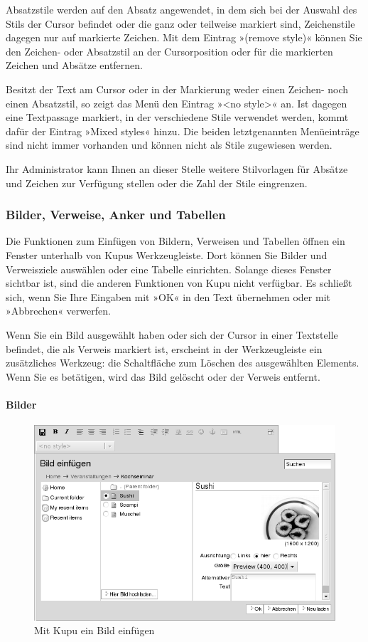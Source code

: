 \documentclass[a4paper,12pt,ngerman]{manual}
\begin{document}
Absatzstile werden auf den Absatz angewendet, in dem sich bei der Auswahl des
Stils der Cursor befindet oder die ganz oder teilweise markiert sind,
Zeichenstile dagegen nur auf markierte Zeichen. Mit dem Eintrag »(remove
style)« können Sie den Zeichen- oder Absatzstil an der Cursorposition oder für
die markierten Zeichen und Absätze entfernen.

Besitzt der Text am Cursor oder in der Markierung weder einen Zeichen- noch
einen Absatzstil, so zeigt das Menü den Eintrag »\textless{}no style\textgreater{}« an. Ist dagegen
eine Textpassage markiert, in der verschiedene Stile verwendet werden, kommt
dafür der Eintrag »Mixed styles« hinzu. Die beiden letztgenannten Menüeinträge
sind nicht immer vorhanden und können nicht als Stile zugewiesen werden.

Ihr Administrator kann Ihnen an dieser Stelle weitere Stilvorlagen für Absätze
und Zeichen zur Verfügung stellen oder die Zahl der Stile eingrenzen.


\subsubsection{Bilder, Verweise, Anker und Tabellen}

Die Funktionen zum Einfügen von Bildern, Verweisen und Tabellen öffnen ein
Fenster unterhalb von Kupus Werkzeugleiste. Dort können Sie Bilder und
Verweisziele auswählen oder eine Tabelle einrichten. Solange dieses Fenster
sichtbar ist, sind die anderen Funktionen von Kupu nicht verfügbar. Es
schließt sich, wenn Sie Ihre Eingaben mit »OK« in den Text übernehmen oder mit
»Abbrechen« verwerfen.

Wenn Sie ein Bild ausgewählt haben oder sich der Cursor in einer Textstelle
befindet, die als Verweis markiert ist, erscheint in der Werkzeugleiste ein
zusätzliches Werkzeug: die Schaltfläche zum Löschen des ausgewählten
Elements. Wenn Sie es betätigen, wird das Bild gelöscht oder der Verweis
entfernt.


\paragraph{Bilder}
\hypertarget{fig-kupu-bild}{}\begin{figure}[htbp]
\centering

\includegraphics{kupu-bild.png}
\caption{Mit Kupu ein Bild einfügen}\end{figure}
\end{document}
